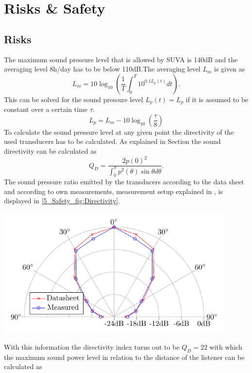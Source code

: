 \chapter{Risks \& Safety}
\section{Risks}
The maximum sound pressure level that is allowed by SUVA is 140dB and the averaging level 8h/day has to be below 110dB.The averaging level $L_m$ is given as
\begin{equation}\label{5_Safety_eq:AveragingLevel}
    L_m = 10 \log_{10} \left (  \frac{1}{T} \int_0^T 10^{0.1 L_p(t)}dt\right ).
\end{equation}
This can be solved for the sound pressure level $L_p(t) = L_p$ if it is assumed to be constant over a certain time $\tau$.
\begin{equation}\label{5_Safety_eq:AveragingLevel_SPL}
    L_p = L_m - 10\log_{10}\left ( \frac{\tau}{8} \right )
\end{equation}
To calculate the sound pressure level at any given point the directivity of the used transducers has to be calculated. As explained in Section  the sound directivity can be calculated as
\begin{equation}\label{5_Safety_eq:Directivity}
    Q_D = \frac{2 p(0)^2}{\int_{0}^{\pi}p^2(\theta)\sin{\theta}d\theta}. 
\end{equation}
The sound pressure ratio emitted by the transducers according to the data sheet and according to own measurements, measurement setup explained in \todo, is displayed in \ref{5_Safety_fig:Directivity}.  
\begin{center}\label{5_Safety_fig:Directivity}
    \includegraphics[width=0.9\textwidth]{images/5_Safety_Risks/Polar_PlotDirectivity.pdf}
\end{center}
With this information the directivity index turns out to be $Q_D = 22$ with which the maximum sound power level in relation to the distance of the listener can be calculated as
